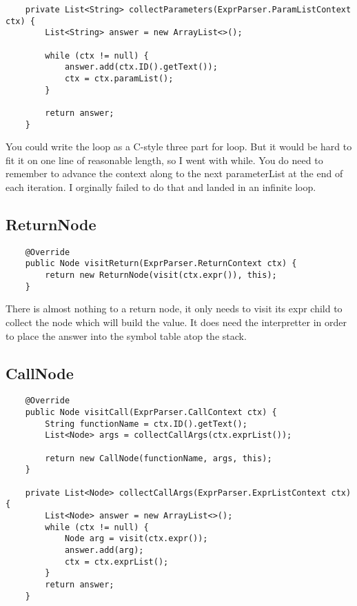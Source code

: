 {\footnotesize
\begin{verbatim}
    private List<String> collectParameters(ExprParser.ParamListContext ctx) {
        List<String> answer = new ArrayList<>();

        while (ctx != null) {
            answer.add(ctx.ID().getText());
            ctx = ctx.paramList();
        }

        return answer;
    }
\end{verbatim}
}

You could write the loop as a C-style three part for loop. But it would
be hard to fit it on one line of reasonable length, so I went with while.
You do need to remember to advance the context along to the next
parameterList at the end of each iteration. I orginally failed to do
that and landed in an infinite loop.

\subsection{ReturnNode}

{\footnotesize
\begin{verbatim}
    @Override
    public Node visitReturn(ExprParser.ReturnContext ctx) {
        return new ReturnNode(visit(ctx.expr()), this);
    }
\end{verbatim}
}

There is almost nothing to a return node, it only needs to visit
its expr child to collect the node which will build the value.
It does need the interpretter in order to place the answer into
the symbol table atop the stack.

\subsection{CallNode}

{\footnotesize
\begin{verbatim}
    @Override
    public Node visitCall(ExprParser.CallContext ctx) {
        String functionName = ctx.ID().getText();
        List<Node> args = collectCallArgs(ctx.exprList());

        return new CallNode(functionName, args, this);
    }

    private List<Node> collectCallArgs(ExprParser.ExprListContext ctx) {
        List<Node> answer = new ArrayList<>();
        while (ctx != null) {
            Node arg = visit(ctx.expr());
            answer.add(arg);
            ctx = ctx.exprList();
        }
        return answer;
    }
\end{verbatim}
}

